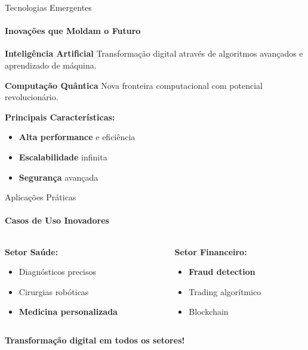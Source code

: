 \documentclass[aspectratio=169]{beamer}
\newcommand{\destaque}[1]{\textcolor{corDestaque}{\textbf{#1}}}
\newcommand{\subtitulo}[1]{\textcolor{corSubtitulo}{\textbf{#1}}}
\begin{document}
\begin{frame}
    \titlepage
\end{frame}

\begin{frame}{Tecnologias Emergentes}
    \framesubtitle{Inovações que Moldam o Futuro}
    
    \begin{block}{\destaque{Inteligência Artificial}}
        Transformação digital através de algoritmos avançados e aprendizado de máquina.
    \end{block}
    
    \begin{block}{\destaque{Computação Quântica}}
        Nova fronteira computacional com potencial revolucionário.
    \end{block}
    
    \vspace{0.5cm}
    
    \subtitulo{Principais Características:}
    \begin{itemize}
        \item \destaque{Alta performance} e eficiência
        \item \destaque{Escalabilidade} infinita
        \item \destaque{Segurança} avançada
    \end{itemize}
\end{frame}

\begin{frame}{Aplicações Práticas}
    \framesubtitle{Casos de Uso Inovadores}
    
    \begin{columns}
        \begin{column}{0.48\textwidth}
            \subtitulo{Setor Saúde:}
            \begin{itemize}
                \item Diagnósticos precisos
                \item Cirurgias robóticas
                \item \destaque{Medicina personalizada}
            \end{itemize}
        \end{column}
        
        \begin{column}{0.48\textwidth}
            \subtitulo{Setor Financeiro:}
            \begin{itemize}
                \item \destaque{Fraud detection}
                \item Trading algorítmico
                \item Blockchain
            \end{itemize}
        \end{column}
    \end{columns}
    
    \vspace{0.8cm}
    
    \centering
    \destaque{Transformação digital em todos os setores!}
\end{frame}
\end{document}
